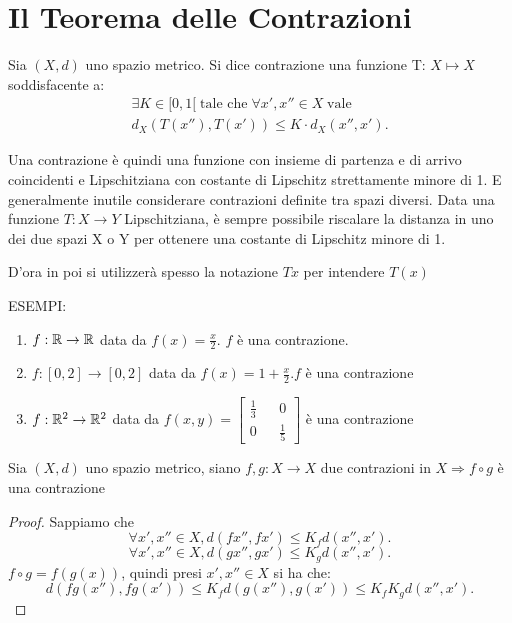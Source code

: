 \section{Il Teorema delle Contrazioni}
\begin{definition}[Contrazione]
	\label{def:contrazione}
	Sia $(X, d)$ uno spazio metrico. Si dice contrazione una funzione T: $X \mapsto X$ soddisfacente a:
	\begin{align}
		\label{eq:def_contrazione}
		\exists K \in [0, 1[\;\text{tale che}\;\forall x',x''\in X\;\text{vale}\\
		d_X(T(x''), T(x')) \le K \cdot d_X(x'', x').
	\end{align}


	Una contrazione è quindi una funzione con insieme di partenza e di arrivo coincidenti e
	Lipschitziana con costante di Lipschitz strettamente minore di 1.
	E generalmente inutile considerare contrazioni definite tra spazi diversi. Data una funzione
	$T: X\rightarrow Y$ Lipschitziana, è sempre possibile riscalare la distanza in uno dei due spazi X o Y
	per ottenere una costante di Lipschitz minore di 1.
	\begin{note}
		D'ora in poi si utilizzerà spesso la notazione $Tx$ per intendere $T(x)$
	\end{note}
\end{definition}

ESEMPI:\\
\begin{enumerate}
	\item $f: \mathbb{R} \rightarrow \mathbb{R}$ data da $f(x) = \frac{x}{2}$. $f$ è una contrazione.
	\item $f: [0,2] \rightarrow [0,2]$ data da $f(x) = 1+\frac{x}{2}. f$ è una contrazione
	\item $f: \mathbb{R}^2 \rightarrow \mathbb{R}^2$ data da $f(x,y)=\begin{bmatrix} \frac{1}{3}&&0\\0&&\frac{1}{5}\end{bmatrix}$ è una contrazione
\end{enumerate}

\proposition
Sia $(X, d)$ uno spazio metrico, siano $f,g:X\rightarrow X$ due contrazioni in $X \Rightarrow f\circ g$ è una contrazione
\begin{proof}
	Sappiamo che\\
	$$\forall x',x''\in X, d(fx'', fx')\le K_fd(x'', x').$$
	$$\forall x',x''\in X, d(gx'', gx')\le K_gd(x'', x').$$
	$f\circ g=f(g(x))$, quindi presi $x',x''\in X$ si ha che: $$d(fg(x''), fg(x'))\le K_fd(g(x''), g(x'))\le K_fK_gd(x'',x').$$
\end{proof}

